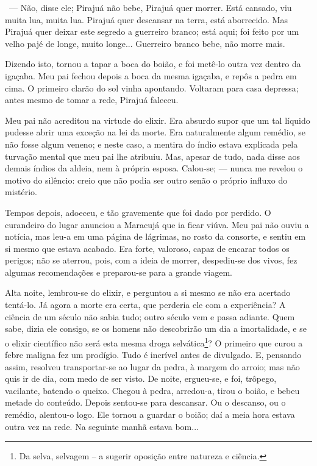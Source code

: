 ~--- Não, disse ele; Pirajuá não bebe, Pirajuá quer morrer. Está
cansado, viu muita lua, muita lua. Pirajuá quer descansar na terra, está
aborrecido. Mas Pirajuá quer deixar este segredo a guerreiro branco;
está aqui; foi feito por um velho pajé de longe, muito longe...
Guerreiro branco bebe, não morre mais.

Dizendo isto, tornou a tapar a boca do boião, e foi metê-lo outra vez
dentro da igaçaba. Meu pai fechou depois a boca da mesma igaçaba, e
repôs a pedra em cima. O primeiro clarão do sol vinha apontando.
Voltaram para casa depressa; antes mesmo de tomar a rede, Pirajuá
faleceu.

Meu pai não acreditou na virtude do elixir. Era absurdo supor que um tal
líquido pudesse abrir uma exceção na lei da morte. Era naturalmente
algum remédio, se não fosse algum veneno; e neste caso, a mentira do
índio estava explicada pela turvação mental que meu pai lhe atribuiu.
Mas, apesar de tudo, nada disse aos demais índios da aldeia, nem à
própria esposa. Calou-se; --- nunca me revelou o motivo do silêncio:
creio que não podia ser outro senão o próprio influxo do mistério.

Tempos depois, adoeceu, e tão gravemente que foi dado por perdido. O
curandeiro do lugar anunciou a Maracujá que ia ficar viúva. Meu pai não
ouviu a notícia, mas leu-a em uma página de lágrimas, no rosto da
consorte, e sentiu em si mesmo que estava acabado. Era forte, valoroso,
capaz de encarar todos os perigos; não se aterrou, pois, com a ideia de
morrer, despediu-se dos vivos, fez algumas recomendações e preparou-se
para a grande viagem.

Alta noite, lembrou-se do elixir, e perguntou a si mesmo se não era
acertado tentá-lo. Já agora a morte era certa, que perderia ele com a
experiência? A ciência de um século não sabia tudo; outro século vem e
passa adiante. Quem sabe, dizia ele consigo, se os homens não
descobrirão um dia a imortalidade, e se o elixir científico não será
esta mesma droga selvática\footnote{Da selva, selvagem -- a sugerir
  oposição entre natureza e ciência.}? O primeiro que curou a febre
maligna fez um prodígio. Tudo é incrível antes de divulgado. E, pensando
assim, resolveu transportar-se ao lugar da pedra, à margem do arroio;
mas não quis ir de dia, com medo de ser visto. De noite, ergueu-se, e
foi, trôpego, vacilante, batendo o queixo. Chegou à pedra, arredou-a,
tirou o boião, e bebeu metade do conteúdo. Depois sentou-se para
descansar. Ou o descanso, ou o remédio, alentou-o logo. Ele tornou a
guardar o boião; daí a meia hora estava outra vez na rede. Na seguinte
manhã estava bom...

